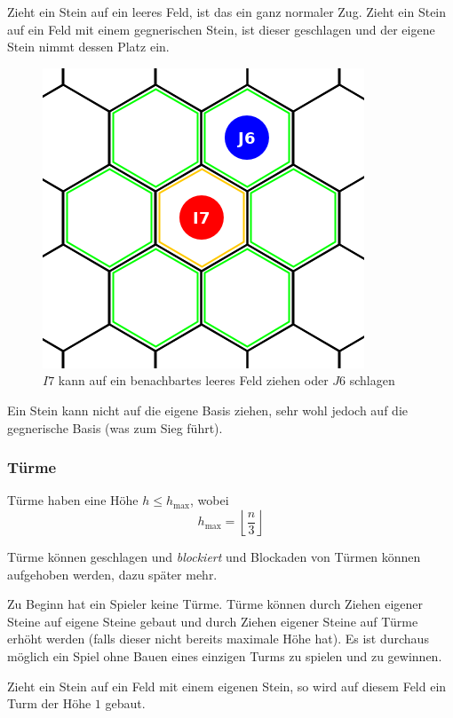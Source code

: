 Zieht ein Stein auf ein leeres Feld, ist das ein ganz normaler Zug. Zieht ein Stein auf ein Feld mit einem gegnerischen Stein, ist dieser geschlagen und der eigene Stein nimmt dessen Platz ein.
\begin{figure}[ht]
\begin{center}
\includegraphics[scale=0.25]{graphic/token-move-kick.png}
\end{center}
\caption*{$I7$ kann auf ein benachbartes leeres Feld ziehen oder $J6$ schlagen}
\end{figure}

Ein Stein kann nicht auf die eigene Basis ziehen, sehr wohl jedoch auf die gegnerische Basis (was zum Sieg führt).
\newpage

\subsubsection*{Türme}
Türme haben eine Höhe $h \le h_\text{max}$, wobei \[h_\text{max} = \left\lfloor \frac{n}{3}\right\rfloor\]

Türme können geschlagen und \emph{blockiert} und Blockaden von Türmen können aufgehoben werden, dazu  später mehr.

\bigskip

Zu Beginn hat ein Spieler keine Türme. Türme können durch Ziehen eigener Steine auf eigene Steine gebaut und durch Ziehen eigener Steine auf Türme erhöht werden (falls dieser nicht bereits maximale Höhe hat). Es ist durchaus möglich ein Spiel ohne Bauen eines einzigen Turms zu spielen und zu gewinnen.

Zieht ein Stein auf ein Feld mit einem eigenen Stein, so wird auf diesem Feld ein Turm der Höhe $1$ gebaut.

